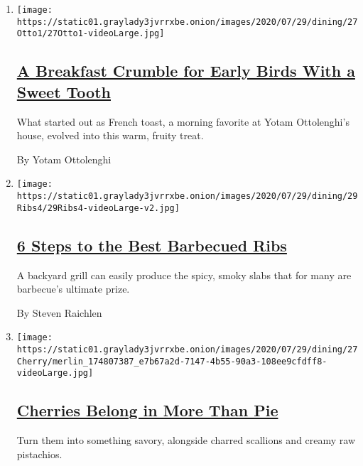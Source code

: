 \begin{enumerate}
\def\labelenumi{\arabic{enumi}.}
\item
  \texttt{[image: https://static01.graylady3jvrrxbe.onion/images/2020/07/29/dining/27Otto1/27Otto1-videoLarge.jpg]}

  \hypertarget{a-breakfast-crumble-for-early-birds-with-a-sweet-tooth}{%
  \subsection{\texorpdfstring{\href{/2020/07/27/dining/breakfast-crumble-recipe.html}{A
  Breakfast Crumble for Early Birds With a Sweet
  Tooth}}{A Breakfast Crumble for Early Birds With a Sweet Tooth}}\label{a-breakfast-crumble-for-early-birds-with-a-sweet-tooth}}

  What started out as French toast, a morning favorite at Yotam
  Ottolenghi's house, evolved into this warm, fruity treat.

  By Yotam Ottolenghi
\item
  \texttt{[image: https://static01.graylady3jvrrxbe.onion/images/2020/07/29/dining/29Ribs4/29Ribs4-videoLarge-v2.jpg]}

  \hypertarget{6-steps-to-the-best-barbecued-ribs}{%
  \subsection{\texorpdfstring{\href{/2020/07/24/dining/bbq-ribs-recipe.html}{6
  Steps to the Best Barbecued
  Ribs}}{6 Steps to the Best Barbecued Ribs}}\label{6-steps-to-the-best-barbecued-ribs}}

  A backyard grill can easily produce the spicy, smoky slabs that for
  many are barbecue's ultimate prize.

  By Steven Raichlen
\item
  \texttt{[image: https://static01.graylady3jvrrxbe.onion/images/2020/07/29/dining/27Cherry/merlin\_174807387\_e7b67a2d-7147-4b55-90a3-108ee9cfdff8-videoLarge.jpg]}

  \hypertarget{cherries-belong-in-more-than-pie}{%
  \subsection{\texorpdfstring{\href{/2020/07/24/dining/cherry-salad-recipe.html}{Cherries
  Belong in More Than
  Pie}}{Cherries Belong in More Than Pie}}\label{cherries-belong-in-more-than-pie}}

  Turn them into something savory, alongside charred scallions and
  creamy raw pistachios.


\end{enumerate}

